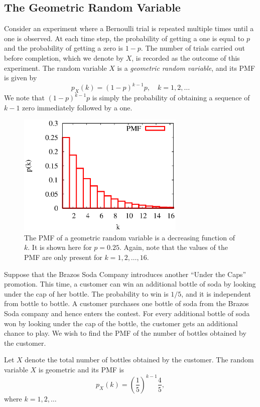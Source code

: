\subsection{The Geometric Random Variable}

Consider an experiment where a Bernoulli trial is repeated multiple times until a one is observed.
At each time step, the probability of getting a one is equal to $p$ and the probability of getting a zero is $1-p$.
The number of trials carried out before completion, which we denote by $X$, is recorded as the outcome of this experiment.
The random variable $X$ is a \emph{geometric random variable}, and its PMF is given by
\begin{equation*}
p_X (k) = (1-p)^{k-1} p, \quad k = 1, 2, \ldots
\end{equation*}
We note that $(1-p)^{k-1} p$ is simply the probability of obtaining a sequence of $k-1$ zero immediately followed by a one.

\begin{figure}[ht]
\begin{center}
\includegraphics[width=8cm]{Figures/5chapter/geometric}
\end{center}
\caption{The PMF of a geometric random variable is a decreasing function of $k$.
It is shown here for $p = 0.25$.
Again, note that the values of the PMF are only present for $k = 1, 2, \ldots, 16$.}
\end{figure}

\begin{example}
Suppose that the Brazos Soda Company introduces another ``Under the Caps'' promotion.
This time, a customer can win an additional bottle of soda by looking under the cap of her bottle.
The probability to win is $1/5$, and it is independent from bottle to bottle.
A customer purchases one bottle of soda from the Brazos Soda company and hence enters the contest.
For every additional bottle of soda won by looking under the cap of the bottle, the customer gets an additional chance to play.
We wish to find the PMF of the number of bottles obtained by the customer.

Let $X$ denote the total number of bottles obtained by the customer.
The random variable $X$ is geometric and its PMF is
\begin{equation*}
p_X (k) = \left( \frac{1}{5} \right)^{k-1} \frac{4}{5},
\end{equation*}
where $k = 1, 2, \ldots$
\end{example}

